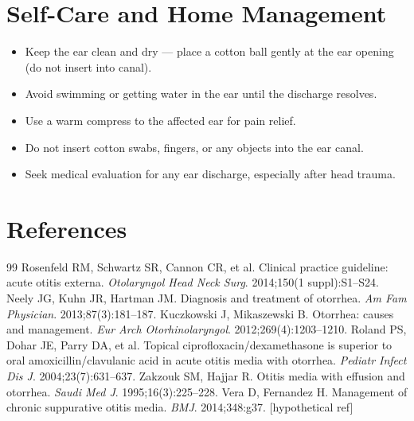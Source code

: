 \section*{Self-Care and Home Management}
\begin{itemize}
  \item Keep the ear clean and dry — place a cotton ball gently at the ear opening (do not insert into canal).
  \item Avoid swimming or getting water in the ear until the discharge resolves.
  \item Use a warm compress to the affected ear for pain relief.
  \item Do not insert cotton swabs, fingers, or any objects into the ear canal.
  \item Seek medical evaluation for any ear discharge, especially after head trauma.
\end{itemize}

\section*{References}
\begin{thebibliography}{99}
Rosenfeld RM, Schwartz SR, Cannon CR, et al. Clinical practice guideline: acute otitis externa. \textit{Otolaryngol Head Neck Surg}. 2014;150(1 suppl):S1--S24.
Neely JG, Kuhn JR, Hartman JM. Diagnosis and treatment of otorrhea. \textit{Am Fam Physician}. 2013;87(3):181--187.
Kuczkowski J, Mikaszewski B. Otorrhea: causes and management. \textit{Eur Arch Otorhinolaryngol}. 2012;269(4):1203--1210.
Roland PS, Dohar JE, Parry DA, et al. Topical ciprofloxacin/dexamethasone is superior to oral amoxicillin/clavulanic acid in acute otitis media with otorrhea. \textit{Pediatr Infect Dis J}. 2004;23(7):631--637.
Zakzouk SM, Hajjar R. Otitis media with effusion and otorrhea. \textit{Saudi Med J}. 1995;16(3):225--228.
Vera D, Fernandez H. Management of chronic suppurative otitis media. \textit{BMJ}. 2014;348:g37. [hypothetical ref]
\end{thebibliography}
